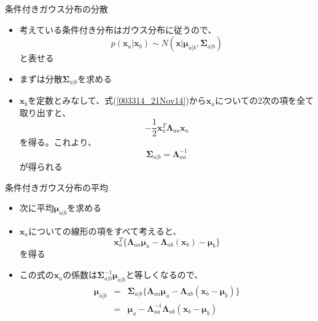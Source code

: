 \begin{frame}{条件付きガウス分布の分散}
 \begin{itemize}
  \item 考えている条件付き分布はガウス分布に従うので、
        \begin{equation}
         p(\bm{x}_a | \bm{x}_b) \sim N(\bm{x} | \bm{\mu}_{a|b}, \bm{\Sigma}_{a|b})
        \end{equation}
        と表せる
  \item まずは分散$\bm{\Sigma}_{a|b}$を求める
  \item $\bm{x}_b$を定数とみなして、式(\ref{003314_21Nov14})から$\bm{x}_a$についての2次の項を全て取り出すと、
        \begin{equation}
         -\frac{1}{2}\bm{x}_a^T\bm{\Lambda}_{aa}\bm{x}_a
        \end{equation}
        を得る。これより、
        \begin{equation}
         \bm{\Sigma}_{a|b} = \bm{\Lambda}_{aa}^{-1}
        \end{equation}
        が得られる
 \end{itemize}
\end{frame}

\begin{frame}{条件付きガウス分布の平均}
 \begin{itemize}
  \item 次に平均$\bm{\mu}_{a|b}$を求める
  \item $\bm{x}_a$についての線形の項をすべて考えると、
        \begin{equation}
         \bm{x}_a^T\{ \bm{\Lambda}_{aa}\bm{\mu}_a-\bm{\Lambda}_{ab}(\bm{x}_b)-\bm{\mu}_b\}
        \end{equation}
        を得る
  \item この式の$\bm{x}_a$の係数は$\bm{\Sigma}^{-1}_{a|b}\bm{\mu}_{a|b}$と等しくなるので、
        \begin{eqnarray}
         \bm{\mu}_{a|b} &=& \bm{\Sigma}_{a|b}\{\bm{\Lambda}_{aa}\bm{\mu}_a-\bm{\Lambda}_{ab}(\bm{x}_b-\bm{\mu}_b)\}\\
         &= & \bm{\mu}_a - \bm{\Lambda}_{aa}^{-1}\bm{\Lambda}_{ab}(\bm{x}_b-\bm{\mu}_b)
        \end{eqnarray}
 \end{itemize}
\end{frame}

